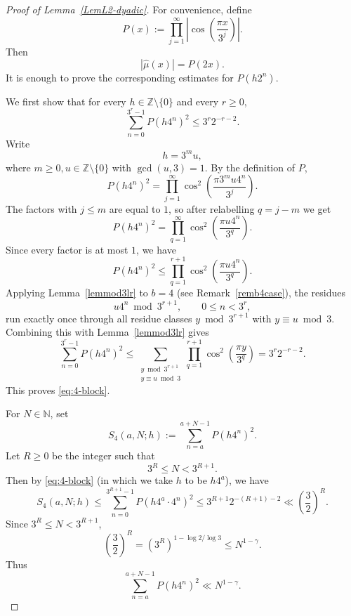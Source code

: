 \documentclass[10pt,a4paper]{amsart}
\numberwithin{equation}{section} %
\newcommand{\N}{\mathbb{N}}
\newcommand{\Z}{\mathbb{Z}}
\begin{document}
\begin{proof}[Proof of Lemma~\ref{LemL2-dyadic}]
For convenience,  define
\begin{equation*}
	P(x) := \prod_{j=1}^{\infty}
	\left|\cos\left(\frac{\pi x}{3^j}\right)\right|.
\end{equation*}
Then
\begin{equation*}
	|\widehat\mu(x)| = P(2x).
\end{equation*}	
	It is enough to prove the corresponding estimates for $P(h2^n)$.
	
We first show that  for every $h\in \Z\setminus\{0\}$ and every $r\ge 0$,
	\begin{equation}\label{eq:4-block}
		\sum_{n=0}^{3^r-1} P(h4^{n})^2
		\leq 3^r2^{-r-2}.
	\end{equation}
	Write
	\[
	h=3^m u,\] 
	where  $m\geq0, u\in \Z\setminus\{0\}$ with  $\gcd(u,3)=1$.
	By the definition of $P$,
	\[
	P(h4^{n})^2
	= \prod_{j=1}^{\infty}
	\cos^2\left(\frac{\pi 3^m u4^{n}}{3^j}\right).
	\]
	The factors with $j\leq m$ are equal to $1$, so after relabelling $q=j-m$ we get
	\[
	P(h4^{n})^2
	= \prod_{q=1}^{\infty}
	\cos^2\left(\frac{\pi u4^{n}}{3^q}\right).
	\]
	Since every factor is at most $1$, we have 
\begin{equation*}
		P(h4^{n})^2
		\le
		\prod_{q=1}^{r+1}
		\cos^2\left(\frac{\pi u4^{n}}{3^q}\right).
	\end{equation*}
Applying Lemma~\ref{lemmod3lr} to $b=4$ (see Remark~\ref{remb4case}), the residues
	\[
	u4^{n}\bmod{3^{r+1}},
	\qquad 0\leq n<3^r,
	\]
	run exactly once through all residue classes $y\bmod{3^{r+1}}$ with $y\equiv u\bmod 3$.  Combining this with Lemma~\ref{lemmod3lr} gives
\[\sum_{n=0}^{3^r-1} P(h4^{n})^2
		\leq
		\sum_{\substack{y\bmod 3^{r+1}\\ y\equiv u\bmod 3}}
		\prod_{q=1}^{r+1}
		\cos^2\left(\frac{\pi y}{3^q}\right)=3^r2^{-r-2}.\]
	This proves \eqref{eq:4-block}.
	
For $N\in\N$, set 
	\[
	S_4(a,N;h):=\sum_{n=a}^{a+N-1} P(h4^n)^2.
	\]
Let $R\geq 0$ be the integer such that 
\[3^R\leq N <3^{R+1}.\]
 Then by \eqref{eq:4-block} (in which we take $h$ to be $h4^{a}$),  we have
	\[
	S_4(a,N;h)
	\leq \sum_{n=0}^{3^{R+1}-1}P(h4^{a}\cdot4^{n})^2\leq 3^{R+1}2^{-(R+1)-2}
	\ll \left(\frac32\right)^R.
	\]
	Since $3^{R}\leq N<3^{R+1}$,
	\[
	\left(\frac32\right)^R
	=(3^R)^{1-\log2/\log3}
	\leq N^{1-\gamma}.
	\]
	Thus
	\begin{equation}\label{eq:4-arbitrary}
		\sum_{n=a}^{a+N-1}P(h4^n)^2\ll N^{1-\gamma} .
	\end{equation}
	


\end{proof}
\end{document}
